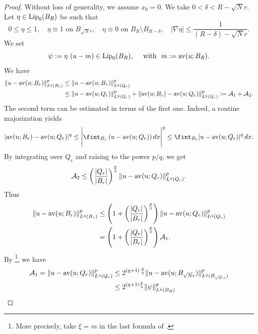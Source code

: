 \documentclass{amsart}
\theoremstyle{definition}
\numberwithin{equation}{section}
\begin{document}
\begin{proof}
	Without loss of generality, we assume $x_0=0$.
	We take $0 < \delta < R - \sqrt{N}r.$ Let $\eta \in {\rm Lip}_0(B_{R})$ be such that 
	\begin{equation*} \label{wirtinger:cut-off-prop}
		0 \leq \eta \leq 1, \quad \eta \equiv 1 \mbox{ on } \overline{B_{\sqrt{N}r}}, \quad \eta \equiv 0 \mbox{ on } B_{R} \setminus B_{R-\delta}, \quad |\nabla \eta| \leq \frac{1}{\left(R- \delta\right) - \sqrt{N}r}. 
	\end{equation*}
	We set 
	\[
	\psi:= \eta\,\left(u - m \right)\in {\rm Lip}_0(B_{R}), \quad \mbox{ with }\,\, m := {\rm av}(u; B_{R}).
	\]
	We have 
	\[
	\begin{split}
		\|u - {\rm av}(u; B_r)\|_{L^q(B_r)}^p &\le 	\|u - {\rm av}(u; B_r)\|_{L^q(Q_r)}^p \\
		&\le \|u - {\rm av}(u; Q_r)\|^p_{L^q(Q_r)} + \|{\rm av}(u; B_r) - {\rm av}(u; Q_r)\|^p_{L^q(Q_r)} := \mathcal{A}_1 + \mathcal{A}_2.
	\end{split}
	\]
	The second term can be estimated in terms of the first one. Indeed, a routine majorization yields
	\[
	|{\rm av}(u; B_r) - {\rm av}(u; Q_r)|^q \le \Bigg|\fint_{B_r} \left(u - {\rm av}(u; Q_r)\right)dx\Bigg|^q \le \fint_{B_r}|u - {\rm av}(u; Q_r)|^q\,dx.
	\]
	By integrating over $Q_r$ and raising to the power $p/q$, we get 
	\[
	\mathcal{A}_2 \le \left(\frac{|Q_r|}{|B_r|}\right)^{\frac{p}{q}} \|u - {\rm av}(u; Q_r)\|^p_{L^q(Q_r)}. 
	\]
	Thus
	\begin{equation} \label{fesso2}
		\begin{split}
			\|u - {\rm av}(u; B_r)\|_{L^q(B_r)}^p &\le \left(1 + \left(\frac{|Q_r|}{|B_r|}\right)^{\frac{p}{q}} \right) \|u - {\rm av}(u; Q_r)\|^p_{L^q(Q_r)}\\ &=  \left(1 + \left(\frac{|Q_r|}{|B_r|}\right)^{\frac{p}{q}} \right) \mathcal{A}_1. 
		\end{split}
	\end{equation}
	By \cite[Remark 2.1]{Gi}\footnote{More precisely, take $\xi = m$ in the last formula of \cite[page 48]{Gi}.}, we have 
	\[
	\begin{split}
		\mathcal{A}_1 = \|u - {\rm av}(u; Q_r)\|_{L^q(Q_r)}^p &\le 2^{(q+1)\,\frac{p}{q}}\|u - {\rm av}(u; B_{\sqrt{N}r})\|^{p}_{L^q(B_{\sqrt{N}\,r})}\\
		&\le 2^{(q+1)\frac{p}{q}}\|\psi\|_{L^{q}(B_{R})}^{p} \\

\end{split}\]
\end{proof}
\end{document}
